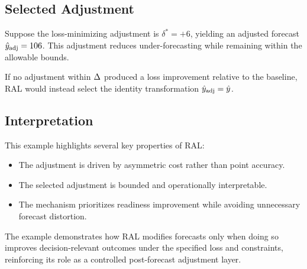\subsection{Selected Adjustment}

Suppose the loss-minimizing adjustment is \(\delta^{*} = +6\), yielding an adjusted
forecast \(\hat{y}_{\text{adj}} = 106\). This adjustment reduces under-forecasting while
remaining within the allowable bounds.

If no adjustment within \(\Delta\) produced a loss improvement relative to the
baseline, RAL would instead select the identity transformation
\(\hat{y}_{\text{adj}} = \hat{y}\).

\subsection{Interpretation}

This example highlights several key properties of RAL:
\begin{itemize}[leftmargin=*]
    \item The adjustment is driven by asymmetric cost rather than point accuracy.
    \item The selected adjustment is bounded and operationally interpretable.
    \item The mechanism prioritizes readiness improvement while avoiding
    unnecessary forecast distortion.
\end{itemize}

The example demonstrates how RAL modifies forecasts only when doing so improves
decision-relevant outcomes under the specified loss and constraints, reinforcing
its role as a controlled post-forecast adjustment layer.
